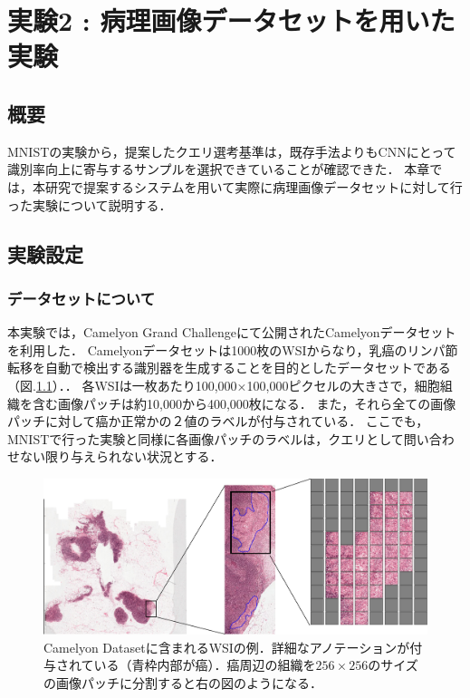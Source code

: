 \chapter{実験2 : 病理画像データセットを用いた実験}
\section{概要}
MNISTの実験から，提案したクエリ選考基準は，既存手法よりもCNNにとって識別率向上に寄与するサンプルを選択できていることが確認できた．
本章では，本研究で提案するシステムを用いて実際に病理画像データセットに対して行った実験について説明する．

\section{実験設定}
\subsection{データセットについて}
本実験では，Camelyon Grand Challenge\cite{Camelyon17}にて公開されたCamelyonデータセットを利用した．
Camelyonデータセットは1000枚のWSIからなり，乳癌のリンパ節転移を自動で検出する識別器を生成することを目的としたデータセットである（図.\ref{fig:camelyon}）．．
各WSIは一枚あたり100,000×100,000ピクセルの大きさで，細胞組織を含む画像パッチは約10,000から400,000枚になる．
また，それら全ての画像パッチに対して癌か正常かの２値のラベルが付与されている．
ここでも，MNISTで行った実験と同様に各画像パッチのラベルは，クエリとして問い合わせない限り与えられない状況とする．

\begin{figure}[h]
  \begin{center}
   \includegraphics[width=12cm]{figures/camelyon.pdf}
  \end{center}
 \caption{\label{fig:camelyon}Camelyon Datasetに含まれるWSIの例．詳細なアノテーションが付与されている（青枠内部が癌）．癌周辺の組織を$256 \times 256$のサイズの画像パッチに分割すると右の図のようになる．}
\end{figure}

